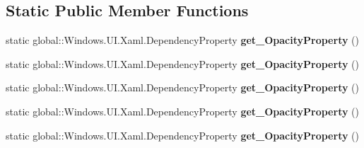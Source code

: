 \subsection*{Static Public Member Functions}
\begin{DoxyCompactItemize}
\item 
\mbox{\label{class_windows_1_1_u_i_1_1_xaml_1_1_u_i_element_a85ce8100e4a4c03669e62dacc2eea001}} 
static global\+::\+Windows.\+U\+I.\+Xaml.\+Dependency\+Property {\bfseries get\+\_\+\+Opacity\+Property} ()
\item 
\mbox{\label{class_windows_1_1_u_i_1_1_xaml_1_1_u_i_element_a85ce8100e4a4c03669e62dacc2eea001}} 
static global\+::\+Windows.\+U\+I.\+Xaml.\+Dependency\+Property {\bfseries get\+\_\+\+Opacity\+Property} ()
\item 
\mbox{\label{class_windows_1_1_u_i_1_1_xaml_1_1_u_i_element_a85ce8100e4a4c03669e62dacc2eea001}} 
static global\+::\+Windows.\+U\+I.\+Xaml.\+Dependency\+Property {\bfseries get\+\_\+\+Opacity\+Property} ()
\item 
\mbox{\label{class_windows_1_1_u_i_1_1_xaml_1_1_u_i_element_a85ce8100e4a4c03669e62dacc2eea001}} 
static global\+::\+Windows.\+U\+I.\+Xaml.\+Dependency\+Property {\bfseries get\+\_\+\+Opacity\+Property} ()
\item 
\mbox{\label{class_windows_1_1_u_i_1_1_xaml_1_1_u_i_element_a85ce8100e4a4c03669e62dacc2eea001}} 
static global\+::\+Windows.\+U\+I.\+Xaml.\+Dependency\+Property {\bfseries get\+\_\+\+Opacity\+Property} ()
\end{DoxyCompactItemize}
